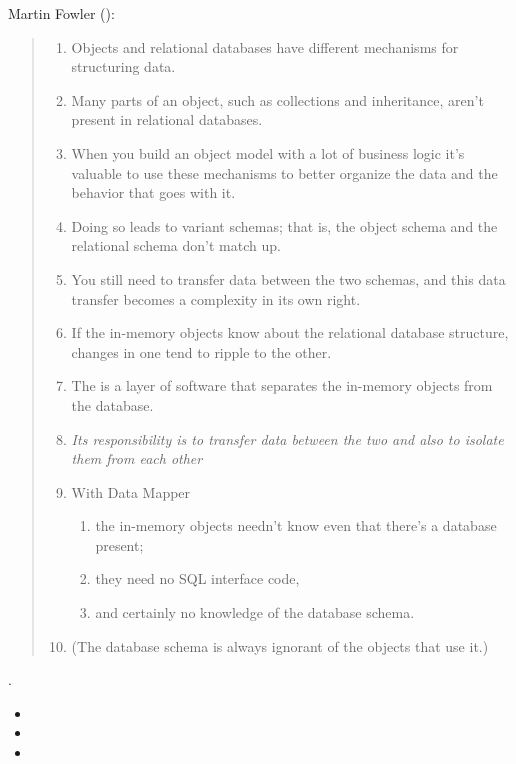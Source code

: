 Martin Fowler 
():

\begin{quote}
\begin{enumerate}
\item 
Objects and relational databases have different mechanisms for structuring
data. 
\item 
Many parts of an object, such as collections and inheritance,
aren't present in relational databases. 
\item 
When you build an
object model with a lot of business logic it's valuable to use these
mechanisms  
to better organize the data and the behavior that goes with
it. 
\item 
Doing so leads to variant schemas; that is, the object
schema and the relational schema don't match up.
\item 
You still need to transfer data between the two schemas, and this data
transfer becomes a complexity in its own right. 
\item 
If the in-memory objects
know about the relational database structure, changes in
one tend to ripple to the other.
\item 
The  is a layer of software that separates the in-memory
objects from the database. 
\item 
\emph{Its responsibility is to transfer data between
the two and also to isolate them from each other}
\item 
 With
Data Mapper 
  \begin{enumerate}
  \item
  the in-memory objects needn't know even that there's a
  database present; 
  \item
  they need no SQL interface code, 
  \item
  and certainly no
  knowledge of the database schema. 
  \end{enumerate}
\item 
  (The database schema is always
  ignorant of the objects that use it.) 
  \end{enumerate}
\end{quote}

.

\begin{itemize}
\item {}
\item
{}
\item
{}
\end{itemize}

